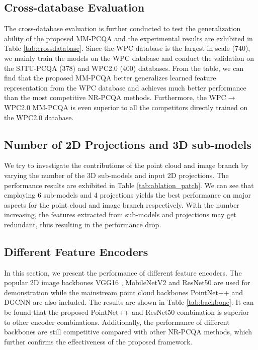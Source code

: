 \documentclass{article}
\begin{document}
\subsection{Cross-database Evaluation}
The cross-database evaluation is further conducted to test the generalization ability of the proposed MM-PCQA and the experimental results are exhibited in Table \ref{tab:crossdatabase}.  Since the WPC database is the largest in scale (740), we mainly train the models on the WPC database and conduct the validation on the SJTU-PCQA (378) and WPC2.0 (400) databases. From the table, we can find that the proposed MM-PCQA better generalizes learned feature representation from the WPC database and achieves much better performance than the most competitive NR-PCQA methods. Furthermore, the WPC$\rightarrow$WPC2.0 MM-PCQA is even superior to all the competitors directly trained on the WPC2.0 database.








 

\subsection{Number of 2D Projections and 3D sub-models}
We try to investigate the contributions of the point cloud and image branch by varying the number of the 3D sub-models and input 2D projections. The performance results are exhibited in Table \ref{tab:ablation_patch}. We can see that employing 6 sub-models and 4 projections yields the best performance on major aspects for the point cloud and image branch respectively. With the number increasing, the features extracted from sub-models and projections may get redundant, thus resulting in the performance drop. 


\subsection{Different Feature Encoders}

In this section, we present the performance of different feature encoders.
The popular 2D image backbones VGG16 \cite{simonyan2014very}, MobileNetV2 \cite{sandler2018mobilenetv2} and ResNet50 \cite{he2016deep} are used for demonstration while the mainstream point cloud backbones PointNet++ \cite{qi2017pointnet++} and DGCNN \cite{wang2019dynamic} are also included. The results are shown in Table \ref{tab:backbone}. It can be found that the proposed PointNet++ and ResNet50 combination is superior to other encoder combinations. Additionally, the performance of different backbones are still competitive compared with other NR-PCQA methods, which further confirms the effectiveness of the proposed framework. 
\end{document}
